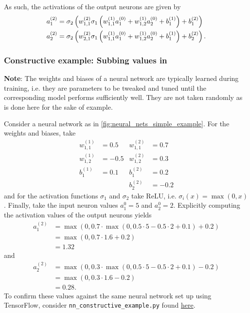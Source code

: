 \documentclass[11pt]{article}
\begin{document}
\noindent As such, the activations of the output neurons are given by
\begin{align*}
    a_1^{(2)}&=\sigma_2\left(w_{1,1}^{(2)}\sigma_1\left(w_{1,1}^{(1)}a_1^{(0)}+w_{1,2}^{(1)}a_2^{(0)}+b_1^{(1)}\right) + b_1^{(2)}\right)\\
    a_2^{(2)}&=\sigma_2\left(w_{2,1}^{(2)}\sigma_1\left(w_{1,1}^{(1)}a_1^{(0)}+w_{1,2}^{(1)}a_2^{(0)}+b_1^{(1)}\right) + b_2^{(2)}\right).
\end{align*}

\subsubsection{Constructive example: Subbing values in}

\noindent\textbf{Note}: The weights and biases of a neural network are typically learned during training, i.e. they are parameters to be tweaked and tuned until the corresponding model performs sufficiently well. They are not taken randomly as is done here for the sake of example.

\vspace{10pt}
\noindent Consider a neural network as in \autoref{fig:neural_nets_simple_example}. For the weights and biases, take
\begin{align*}
    w_{1,1}^{(1)} & =  0.5 & w_{1,1}^{(2)} &= 0.7 \\
    w_{1,2}^{(1)} & = -0.5 & w_{1,2}^{(2)} &= 0.3 \\
    b_1^{(1)}     & =  0.1 & b_1^{(2)}     & =  0.2 \\
                  &        & b_2^{(2)}     & = -0.2
\end{align*}
and for the activation functions $\sigma_1$ and $\sigma_2$ take ReLU, i.e. $\sigma_i(x)=\max(0, x)$.  Finally, take the input neuron values $a_1^{0}=5$ and $a_2^{0}=2$. Explicitly computing the activation values of the output neurons yields
\begin{align*}
    a_1^{(2)}
    &=
    \max(0, 0.7\cdot\max(0, 0.5\cdot5-0.5\cdot2+0.1)+0.2)\\
    &=
    \max(0, 0.7\cdot1.6+0.2)\\
    &=1.32
\end{align*}
and
\begin{align*}
    a_2^{(2)}
    &=
    \max(0, 0.3\cdot\max(0, 0.5\cdot5-0.5\cdot2+0.1)-0.2)\\
    &=
    \max(0, 0.3\cdot1.6-0.2)\\
    &=0.28.
\end{align*}
To confirm these values against the same neural network set up using TensorFlow, consider \texttt{nn\_constructive\_example.py} found \href{https://gitlab.com/dewibatista/master/-/tree/main/_Done/Personal}{here}.
\end{document}
